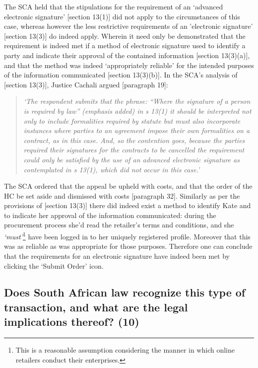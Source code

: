\documentclass[11pt]{article}
\begin{document}
The SCA held that the stipulations for the requirement of an `advanced
electronic signature' [section 13(1)]\cite{rsa02_elect_comm_trans_act} did not
apply to the circumstances of this case, whereas however the less restrictive
requirements of an 'electronic signature' [section
13(3)]\cite{rsa02_elect_comm_trans_act} do indeed apply. Wherein it need only be
demonstrated that the requirement is indeed met if a method of electronic
signature used to identify a party and indicate their approval of the contained
information [section 13(3)(a)]\cite{rsa02_elect_comm_trans_act}, and that the
method was indeed `appropriately reliable' for the intended purposes of the
information communicated [section 13(3)(b)]\cite{rsa02_elect_comm_trans_act}. In
the SCA's analysis of [section 13(3)]\cite{rsa02_elect_comm_trans_act}, Justice
Cachali argued [paragraph 19]\cite{Cachalia15_spring_forest_v_wilberry}:
\begin{quote}
\textit{‘The respondent submits that the phrase: “Where the signature of a person is required by law” (emphasis added) in s 13(1) it should be interpreted not only to include formalities required by statute but must also incorporate instances where parties to an agreement impose their own formalities on a contract, as in this case. And, so the contention goes, because the parties required their signatures for the contracts to be cancelled the requirement could only be satisfied by the use of an advanced electronic signature as contemplated in s 13(1), which did not occur in this case.’}
\end{quote}
The SCA ordered that the appeal be upheld with costs, and that the order of the
HC be set aside and dismissed with costs [paragraph
32]\cite{Cachalia15_spring_forest_v_wilberry}. Similarly as per the provisions of
[section 13(3)]\cite{rsa02_elect_comm_trans_act} there did indeed exist a method
to identify Kate and to indicate her approval of the information communicated:
during the procurement process she'd read the retailer's terms and conditions,
and she \emph{`must'}\footnote{This is a reasonable assumption considering the manner in
which online retailers conduct their enterprises.} have been logged in to her
uniquely registered profile. Moreover that this was as reliable as was
appropriate for those purposes. Therefore one can conclude that the
requirements for an electronic signature have indeed been met by clicking the
`Submit Order' icon.

\subsection{Does South African law recognize this type of transaction, and what are the legal implications thereof? (10)}
\label{sec:orgeab2c68}
\end{document}
